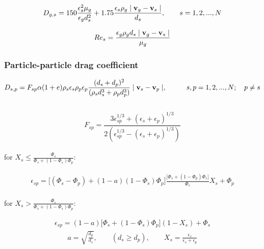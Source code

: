 \begin{equation}
D_{g,s}=150 \frac{\epsilon_{s}^{2}\mu_{g}}{\epsilon_{g} d_{s}^{2}} +
1.75 \frac{\epsilon_{s}\rho_{g}\mid {\bf v}_{g}-
{\bf v}_{s}\mid}{d_{s}}, \qquad s=1,2,...,N
\label{eq:drag_more}
\end{equation}

\begin{equation}
Re_{s}=\frac{\epsilon_{g}\rho_{g}d_{s}\mid 
{\bf v}_{g}-{\bf v}_{s}\mid}{\mu_{g}}
\label{eq:reynolds}
\end{equation}

\subsubsection{\hspace{1cm}Particle-particle drag coefficient}

\begin{equation}
D_{s,p} = F_{sp} \alpha (1+e) \rho_s \epsilon_{s} \rho_p \epsilon_{p}
\frac{(d_{s}+d_{p})^{2}}
{(\rho_{s}d_{s}^{3}+ \rho_{p}d_{p}^{3})} \mid {\bf v}_{s}-{\bf v}_{p}\mid,
\hspace{10mm} s,p = 1,2,...,N; \quad p \neq s
\label{eq:ppdrag}
\end{equation}\\

\begin{equation}
F_{sp} = \frac {3 \epsilon_{sp}^{1/3} + (\epsilon_s + \epsilon_p)^{1/3}} 
{2(\epsilon_{sp}^{1/3}-(\epsilon_s+\epsilon_p)^{1/3})}
\label{eq:effe}
\end{equation}\\

\noindent
for $\displaystyle X_s \leq \frac{\Phi_s}{\Phi_s+(1-\Phi_s)\Phi_p}$:

\begin{eqnarray}
\epsilon_{sp}=\big[(\Phi_s-\Phi_p)+(1-a)(1-\Phi_s)\Phi_p\big]
\frac {\big[\Phi_s + (1-\Phi_p)\Phi_s \big]} {\Phi_s} X_s + \Phi_p
\end{eqnarray}\\

\noindent
for $\displaystyle X_s > \frac{\Phi_s}{\Phi_s+(1-\Phi_s)\Phi_p}$:

\begin{eqnarray}
\epsilon_{sp}=(1-a)\big[\Phi_s + (1-\Phi_s)\Phi_p \big] (1-X_s) + \Phi_s
\end{eqnarray}
%
\begin{eqnarray}
a=\sqrt{\frac{d_p}{d_s}}, \qquad (d_s \geq d_p), 
\qquad X_s = \frac{\epsilon_s}{\epsilon_s + \epsilon_p}
\end{eqnarray}\\
%

